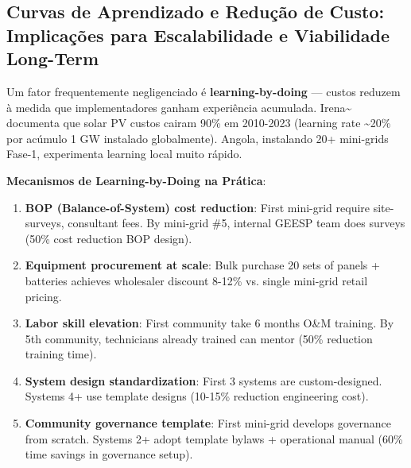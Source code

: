 \documentclass[12pt, a4paper]{article}
\begin{document}
\subsection{Curvas de Aprendizado e Redução de Custo: Implicações para Escalabilidade e Viabilidade Long-Term}

Um fator frequentemente negligenciado é \textbf{learning-by-doing} — custos reduzem à medida que implementadores ganham experiência acumulada. Irena\textasciitilde{}\citep{IRENA2023a} documenta que solar PV custos cairam 90\% em 2010-2023 (learning rate \textasciitilde 20\% por acúmulo 1 GW instalado globalmente). Angola, instalando 20+ mini-grids Fase-1, experimenta learning local muito rápido.

\begin{table}[H]
\centering
\caption{Projeção de Cost Reduction via Learning-by-Doing (Huíla 20 Mini-Grids Phase 1)}
\label{tab:learning_curve}
\small
{}
\end{table}

\textbf{Mecanismos de Learning-by-Doing na Prática}:
\begin{enumerate}
\item \textbf{BOP (Balance-of-System) cost reduction}: First mini-grid require site-surveys, consultant fees. By mini-grid \#5, internal GEESP team does surveys (50\% cost reduction BOP design).
\item \textbf{Equipment procurement at scale}: Bulk purchase 20 sets of panels + batteries achieves wholesaler discount 8-12\% vs. single mini-grid retail pricing.
\item \textbf{Labor skill elevation}: First community take 6 months O\&M training. By 5th community, technicians already trained can mentor (50\% reduction training time).
\item \textbf{System design standardization}: First 3 systems are custom-designed. Systems 4+ use template designs (10-15\% reduction engineering cost).
\item \textbf{Community governance template}: First mini-grid develops governance from scratch. Systems 2+ adopt template bylaws + operational manual (60\% time savings in governance setup).
\end{enumerate}
\end{document}
